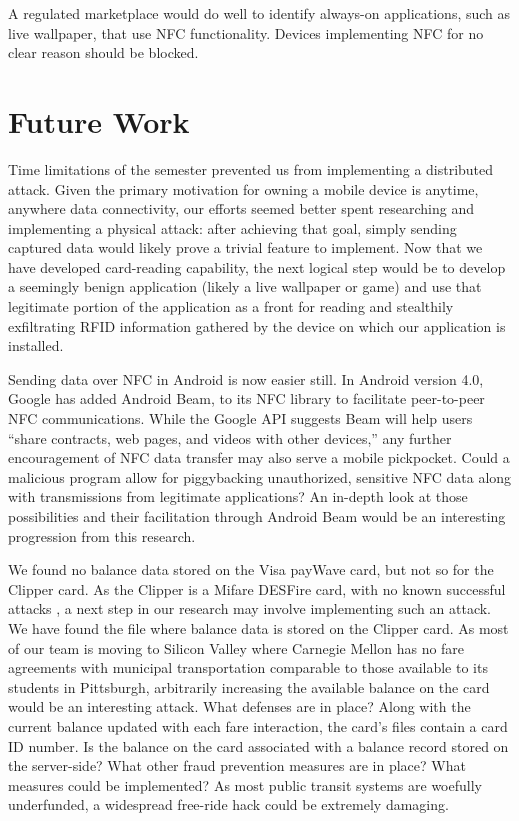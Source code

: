 \documentclass{IEEEtran}
\begin{document}
A regulated marketplace would do well to identify always-on applications, such as live wallpaper, that use NFC functionality.  Devices implementing NFC for no clear reason should be blocked.

\section{Future Work}
Time limitations of the semester prevented us from implementing a distributed attack.  Given the primary motivation for owning a mobile device is anytime, anywhere data connectivity, our efforts seemed better spent researching and implementing a physical attack:  after achieving that goal, simply sending captured data would likely prove a trivial feature to implement.  Now that we have developed card-reading capability, the next logical step would be to develop a seemingly benign application (likely a live wallpaper or game) and use that legitimate portion of the application as a front for reading and stealthily exfiltrating RFID information gathered by the device on which our application is installed.  

Sending data over NFC in Android is now easier still.  In Android version 4.0, Google has added Android Beam, \cite{ieee-beacon-mobileos-review} to its NFC library to facilitate peer-to-peer NFC communications.  While the Google API suggests Beam will help users ``share contracts, web pages, and videos with other devices,'' \cite{android-developers-beam} any further encouragement of NFC data transfer may also serve a mobile pickpocket.  Could a malicious program allow for piggybacking unauthorized, sensitive NFC data along with transmissions from legitimate applications?  An in-depth look at those possibilities and their facilitation through Android Beam would be an interesting progression from this research.       

We found no balance data stored on the Visa payWave card, but not so for the Clipper card.  As the Clipper is a Mifare DESFire card, with no known successful attacks \cite{farebot-1}, a next step in our research may involve implementing such an attack.  We have found the file where balance data is stored on the Clipper card.  As most of our team is moving to Silicon Valley where Carnegie Mellon has no fare agreements with municipal transportation comparable to those available to its students in Pittsburgh, arbitrarily increasing the available balance on the card would be an interesting attack.  What defenses are in place?  Along with the current balance updated with each fare interaction, the card's files contain a card ID number.  Is the balance on the card associated with a balance record stored on the server-side?  What other fraud prevention measures are in place?  What measures could be implemented?  As most public transit systems are woefully underfunded, a widespread free-ride hack could be extremely damaging.
\end{document}
